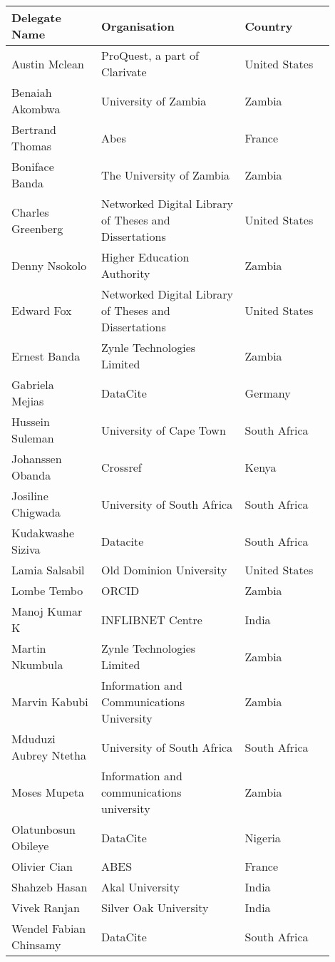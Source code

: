 
\begin{center}
\begin{longtable}{p{0.25\linewidth} p{0.4\linewidth} p{0.25\linewidth}}
\toprule
\textbf{Delegate Name} & \textbf{Organisation} & \textbf{Country} \\
\midrule
Austin Mclean & ProQuest, a part of Clarivate & United States \\  \hline
Benaiah Akombwa & University of Zambia & Zambia \\  \hline
Bertrand Thomas & Abes & France \\  \hline
Boniface Banda & The University of Zambia & Zambia \\  \hline
Charles Greenberg & Networked Digital Library of Theses and Dissertations & United States \\  \hline
Denny Nsokolo & Higher Education Authority & Zambia \\  \hline
Edward Fox & Networked Digital Library of Theses and Dissertations & United States \\  \hline
Ernest Banda & Zynle Technologies Limited & Zambia \\  \hline
Gabriela Mejias & DataCite & Germany \\  \hline
Hussein Suleman & University of Cape Town & South Africa \\  \hline
Johanssen Obanda & Crossref & Kenya \\  \hline
Josiline Chigwada & University of South Africa & South Africa \\  \hline
Kudakwashe Siziva & Datacite & South Africa \\  \hline
Lamia Salsabil & Old Dominion University & United States \\  \hline
Lombe Tembo & ORCID & Zambia \\  \hline
Manoj Kumar K & INFLIBNET Centre & India \\  \hline
Martin Nkumbula & Zynle Technologies Limited & Zambia \\  \hline
Marvin Kabubi & Information and Communications University & Zambia \\  \hline
Mduduzi Aubrey Ntetha & University of South Africa & South Africa \\  \hline
Moses Mupeta & Information and communications university & Zambia \\  \hline
Olatunbosun Obileye & DataCite & Nigeria \\  \hline
Olivier Cian & ABES & France \\  \hline
Shahzeb Hasan & Akal University & India \\  \hline
Vivek Ranjan & Silver Oak University & India \\  \hline
Wendel Fabian Chinsamy & DataCite & South Africa \\  \hline
\end{longtable}
\end{center}
